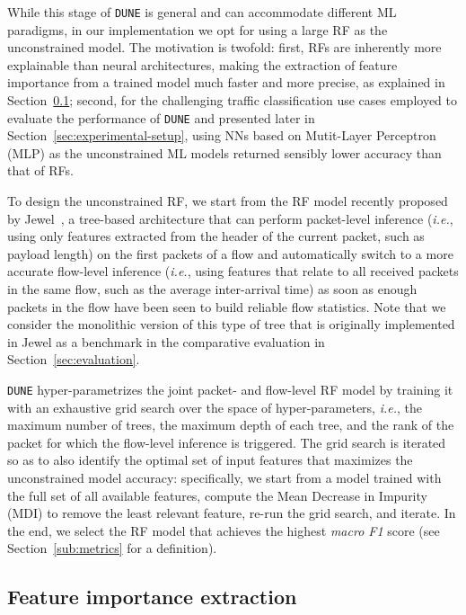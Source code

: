 \documentclass[journal]{IEEEtran}
\theoremstyle{plain} %
\newcommand{\ie}{\textit{i.e.},\xspace}
\newcommand{\name}{\texttt{\fontsize{9}{11}\selectfont DUNE}\xspace}
\begin{document}
While this stage of \name is general and can accommodate different ML paradigms, in our implementation we opt for using a large RF as the unconstrained model. The motivation is twofold: first, RFs are inherently more explainable than neural architectures, making the extraction of feature importance from a trained model much faster and more precise, as explained in Section~\ref{sub:feature-importance}; second, for the challenging traffic classification use cases employed to evaluate the performance of \name and presented later in Section~\ref{sec:experimental-setup}, using NNs based on Mutit-Layer Perceptron (MLP) as the unconstrained ML models returned sensibly lower accuracy than that of RFs.

To design the unconstrained RF, we start from the RF model recently proposed by Jewel~\cite{jewel-infocom24}, a tree-based architecture that can perform packet-level inference (\ie using only features extracted from the header of the current packet, such as payload length) on the first packets of a flow and automatically switch to a more accurate flow-level inference (\ie using features that relate to all received packets in the same flow, such as the average inter-arrival time) as soon as enough packets in the flow  have been seen to build reliable flow statistics. Note that we consider the monolithic version of this type of tree that is originally implemented in Jewel as a benchmark in the comparative evaluation in Section~\ref{sec:evaluation}.

\name hyper-parametrizes the joint packet- and flow-level RF model by training it with an exhaustive grid search over the space of hyper-parameters, \ie the maximum number of trees, the maximum depth of each tree, and the rank of the packet for which the flow-level inference is triggered. The grid search is iterated so as to also identify the optimal set of input features that maximizes the unconstrained model accuracy: specifically, we start from a model trained with the full set of all available features, compute the Mean Decrease in Impurity (MDI) to remove the least relevant feature, re-run the grid search, and iterate. In the end, we select the RF model that achieves the highest \textit{macro F1} score (see Section~\ref{sub:metrics} for a definition).

\subsection{Feature importance extraction}
\label{sub:feature-importance}
\end{document}
